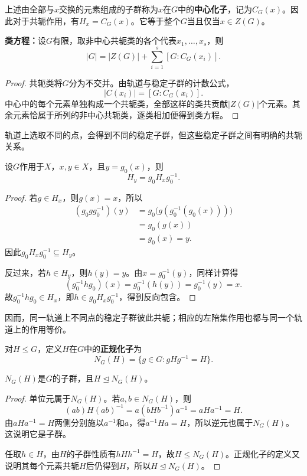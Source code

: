 \begin{definition}
\label{p2:concept:c2-l1162}上述由全部与$x$交换的元素组成的子群称为$x$在$G$中的\textbf{中心化子}，记为$C_G(x)$。因此对于共轭作用，有$H_x=C_G(x)$。它等于整个$G$当且仅当$x\in Z(G)$。
\end{definition}

\begin{theorem}\label{p2:class-equation}
\textbf{类方程：}设$G$有限，取非中心共轭类的各个代表$x_1,\ldots,x_s$，则
\[
|G|=|Z(G)|+\sum_{i=1}^s[G:C_G(x_i)].
\]
\end{theorem}
\begin{proof}
共轭类将$G$分为不交并。由轨道与稳定子群的计数公式，
\[
|C(x_i)|=[G:C_G(x_i)].
\]
中心中的每个元素单独构成一个共轭类，全部这样的类共贡献$|Z(G)|$个元素。其余元素恰属于所列的非中心共轭类，逐类相加便得到类方程。
\end{proof}

轨道上选取不同的点，会得到不同的稳定子群，但这些稳定子群之间有明确的共轭关系。

\begin{theorem}
设$G$作用于$X$，$x,y\in X$，且$y=g_0(x)$，则
\[
H_y=g_0H_xg_0^{-1}.
\]
\end{theorem}
\begin{proof}
若$g\in H_x$，则$g(x)=x$，所以
\begin{align*}
(g_0gg_0^{-1})(y)
&=g_0\bigl(g(g_0^{-1}(g_0(x)))\bigr)\\
&=g_0(g(x))\\
&=g_0(x)=y.
\end{align*}
因此$g_0H_xg_0^{-1}\subseteq H_y$。

反过来，若$h\in H_y$，则$h(y)=y$。由$x=g_0^{-1}(y)$，同样计算得
\[
(g_0^{-1}hg_0)(x)
=g_0^{-1}(h(y))=g_0^{-1}(y)=x.
\]
故$g_0^{-1}hg_0\in H_x$，即$h\in g_0H_xg_0^{-1}$，得到反向包含。
\end{proof}

因而，同一轨道上不同点的稳定子群彼此共轭；相应的左陪集作用也都与同一个轨道上的作用等价。

\begin{definition}
\label{p2:concept:c2-l1208}对$H\leq G$，定义$H$在$G$中的\textbf{正规化子}为
\[
N_G(H)=\{g\in G:gHg^{-1}=H\}.
\]
\end{definition}
\begin{proposition}
$N_G(H)$是$G$的子群，且$H\trianglelefteq N_G(H)$。
\end{proposition}
\begin{proof}
单位元属于$N_G(H)$。若$a,b\in N_G(H)$，则
\[
(ab)H(ab)^{-1}=a(bHb^{-1})a^{-1}=aHa^{-1}=H.
\]
由$aHa^{-1}=H$两侧分别施以$a^{-1}$和$a$，得$a^{-1}Ha=H$，所以逆元也属于$N_G(H)$。这说明它是子群。

任取$h\in H$，由$H$的子群性质有$hHh^{-1}=H$，故$H\leq N_G(H)$。正规化子的定义又说明其每个元素共轭$H$后仍得到$H$，所以$H\trianglelefteq N_G(H)$。
\end{proof}

